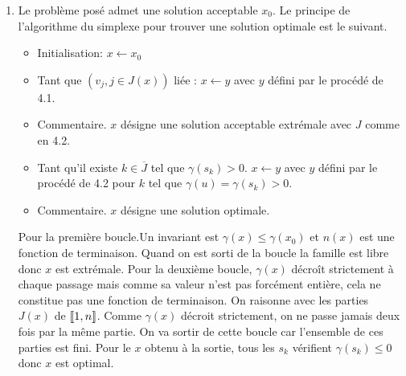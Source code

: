 \begin{enumerate}
  \item Le problème posé admet une solution acceptable $x_0$. Le principe de l'algorithme du simplexe pour trouver une solution optimale est le suivant.
\begin{itemize}
  \item Initialisation: $x \leftarrow x_0$
  \item Tant que $\left(v_j, j\in J(x)\right)$ liée :\newline
  \hspace*{1cm} $x\leftarrow y$ avec $y$ défini par le procédé de 4.1.
  \item Commentaire. $x$ désigne une solution acceptable extrémale avec $J$ comme en 4.2.
  \item Tant qu'il existe $k \in \overline{J}$ tel que $\gamma(s_k) > 0$.\newline
  \hspace*{1cm} $x\leftarrow y$ avec $y$ défini par le procédé de 4.2 pour $k$ tel que $\gamma(u)=\gamma(s_k)>0$.
  \item Commentaire. $x$ désigne une solution optimale.
\end{itemize}
Pour la première boucle.Un invariant est $\gamma(x) \leq \gamma(x_0)$ et $n(x)$ est une fonction de terminaison.\newline
Quand on est sorti de la boucle la famille est libre donc $x$ est extrémale.\newline
Pour la deuxième boucle, $\gamma(x)$ décroît strictement à chaque passage mais comme sa valeur n'est pas forcément entière, cela ne constitue pas une fonction de terminaison.\newline
On raisonne avec les parties $J(x)$ de $\llbracket 1,n\rrbracket$. Comme $\gamma(x)$ décroit strictement, on ne passe jamais deux fois par la même partie. On va sortir de cette boucle car l'ensemble de ces parties est fini.\newline
Pour le $x$ obtenu à la sortie, tous les $s_k$ vérifient $\gamma(s_k)\leq 0$ donc $x$ est optimal.
\end{enumerate}
